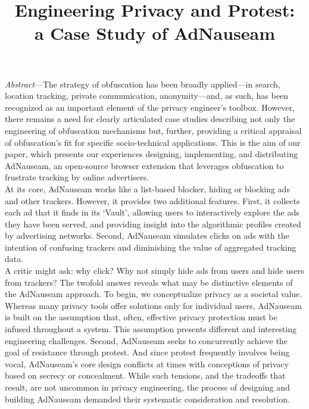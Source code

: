 \documentclass[conference]{IEEEtran}
\begin{document}
\title{Engineering Privacy and Protest:\\a Case Study of AdNauseam}

\author{
   \and
}

\maketitle

\emph{Abstract}---The strategy of obfuscation has been broadly applied---in search, location tracking, private communication, anonymity---and, as such, has been recognized as an important element of the privacy engineer's toolbox. However, there remains a need for clearly articulated case studies describing not only the engineering of obfuscation mechanisms but, further, providing a critical appraisal of obfuscation's fit for specific socio-technical applications. This is the aim of our paper, which presents our experiences designing, implementing, and distributing AdNauseam, an open-source browser extension that leverages obfuscation to frustrate tracking by online advertisers.\\
\indent At its core, AdNauseam works like a list-based blocker, hiding or blocking ads and other trackers. However, it provides two additional features. First, it collects each ad that it finds in its ‘Vault’, allowing users to interactively explore the ads they have been served, and providing insight into the algorithmic profiles created by advertising networks. Second, AdNauseam simulates clicks on ads with the intention of confusing trackers and diminishing the value of aggregated tracking data.\\
\indent A critic might ask: why click? Why not simply hide ads from users and hide users from trackers? The twofold answer reveals what may be distinctive elements of the AdNauseam approach. To begin, we conceptualize privacy as a societal value. Whereas many privacy tools offer solutions only for individual users, AdNauseam is built on the assumption that, often, effective privacy protection must be infused throughout a system. This assumption presents different and interesting engineering challenges. Second, AdNauseam seeks to concurrently achieve the goal of resistance through protest. And since protest frequently involves being vocal, AdNauseam's core design conflicts at times with conceptions of privacy based on secrecy or concealment. While such tensions, and the tradeoffs that result, are not uncommon in privacy engineering,  the process of designing and building AdNauseam demanded their systematic consideration and resolution.\\
\end{document}
